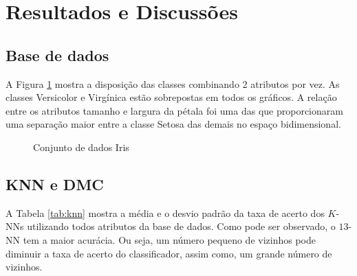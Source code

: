 \documentclass{article}
\begin{document}
\section{Resultados e Discussões}

\subsection{Base de dados}
A Figura \ref{img:iris} mostra a disposição das classes combinando 2 atributos por vez. As classes Versicolor e Virgínica estão sobrepostas em todos os gráficos. A relação entre os atributos tamanho e largura da pétala foi uma das que proporcionaram uma separação maior entre a classe Setosa das demais no espaço bidimensional.

\begin{figure}[!h]
\begin{center}
\caption{Conjunto de dados Iris}
\label{img:iris}
\end{center}
\end{figure}

\subsection{KNN e DMC}
A Tabela \ref{tab:knn} mostra a média e o desvio padrão da taxa de acerto dos $K$-NNs utilizando todos atributos da base de dados. Como pode ser observado, o $13$-NN tem a maior acurácia. Ou seja, um número pequeno de vizinhos pode diminuir a taxa de acerto do classificador, assim como, um grande número de vizinhos.

\end{document}
